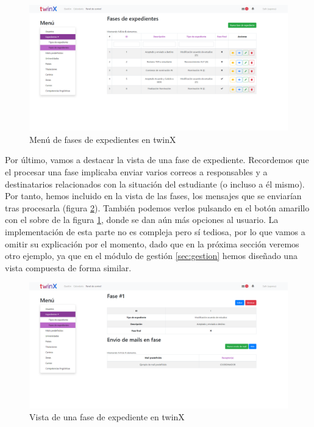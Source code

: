 \begin{figure}
	\centering
	\includegraphics[width=\textwidth]{img/Capturas de twinX/fases_expedientes_index}
	\caption{Menú de fases de expedientes en twinX}
	\label{fig:fasesexpedientesindex}
\end{figure}

Por último, vamos a destacar la vista de una fase de expediente. Recordemos que el procesar una fase implicaba enviar varios correos a responsables y a destinatarios relacionados con la situación del estudiante (o incluso a él mismo). Por tanto, hemos incluido en la vista de las fases, los mensajes que se enviarían tras procesarla (figura \ref{fig:fasesexpedientesvista}). También podemos verlos pulsando en el botón amarillo con el sobre de la figura \ref{fig:fasesexpedientesindex}, donde se dan aún más opciones al usuario. La implementación de esta parte no es compleja pero sí tediosa, por lo que vamos a omitir su explicación por el momento, dado que en la próxima sección veremos otro ejemplo, ya que en el módulo de gestión \ref{sec:gestion} hemos diseñado una vista compuesta de forma similar.

\begin{figure}
	\centering
	\includegraphics[width=\textwidth]{img/Capturas de twinX/fases_expedientes_vista}
	\caption{Vista de una fase de expediente en twinX}
	\label{fig:fasesexpedientesvista}
\end{figure}



